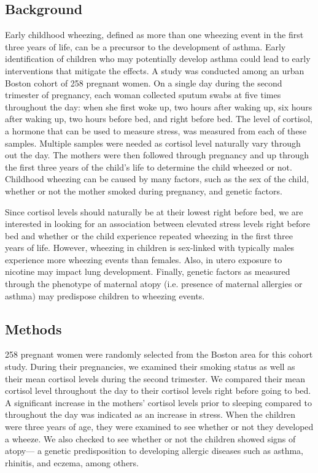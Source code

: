 \documentclass{article}
\begin{document}
	

	\newpage
	\subsection*{Background}
	
	Early childhood wheezing, defined as more than one wheezing event in the first three years of life, can be a precursor to the development of asthma. Early identification of children who may potentially develop asthma could lead to early interventions that mitigate the effects. A study was conducted among an urban Boston cohort of 258 pregnant women. On a single day during the second trimester of pregnancy, each woman collected sputum swabs at five times throughout the day: when she first woke up, two hours after waking up, six hours after waking up, two hours before bed, and right before bed. The level of cortisol, a hormone that can be used to measure stress, was measured from each of these samples. Multiple samples were needed as cortisol level naturally vary through out the day. The mothers were then followed through pregnancy and up through the first three years of the child's life to determine the child wheezed or not. Childhood wheezing can be caused by many factors, such as the sex of the child, whether or not the mother smoked during pregnancy, and genetic factors.
	
	Since cortisol levels should naturally be at their lowest right before bed, we are interested in looking for an association between elevated stress levels right before bed and whether or the child experience repeated wheezing in the first three years of life. However, wheezing in children is sex-linked with typically males experience more wheezing events than females. Also, in utero exposure to nicotine may impact lung development. Finally, genetic factors as measured through the phenotype of maternal atopy (i.e. presence of maternal allergies or asthma) may predispose children to wheezing events.

	\subsection*{Methods}
	258 pregnant women were randomly selected from the Boston area for this cohort study. During their pregnancies, we examined their smoking status as well as their mean cortisol levels during the second trimester. We compared their mean cortisol level throughout the day to their cortisol levels right before going to bed. A significant increase in the mothers’ cortisol levels prior to sleeping compared to throughout the day was indicated as an increase in stress. When the children were three years of age, they were examined to see whether or not they developed a wheeze. We also checked to see whether or not the children showed signs of atopy— a genetic predisposition to developing allergic diseases such as asthma, rhinitis, and eczema, among others.
\end{document}

